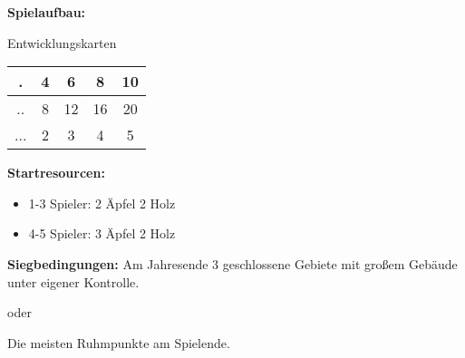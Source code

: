 \documentclass[6pt]{scrreprt}
\begin{document}
  \pagebreak

  \textbf{Spielaufbau:}


  \begin{table}[htp]
    \centering
    Entwicklungskarten
    \label{tab:development_cards}
    \begin{tabular}{c|cccc}
      .   & 4 & 6  & 8  & 10 \\ \hline
      ..  & 8 & 12 & 16 & 20 \\ \hline
      ... & 2 & 3  & 4  & 5  \\
    \end{tabular}
  \end{table}

  \textbf{Startresourcen:}
  \begin{itemize}[topsep=1pt, partopsep=0pt, parsep=0pt, itemsep=0pt, leftmargin=12pt]
    \item 1-3 Spieler: 2 Äpfel 2 Holz
    \item 4-5 Spieler: 3 Äpfel 2 Holz
  \end{itemize}

  \textbf{Siegbedingungen:}
  \center
  Am Jahresende 3 geschlossene Gebiete mit großem Gebäude unter eigener Kontrolle.

  oder

  Die meisten Ruhmpunkte am Spielende.
\end{document}
